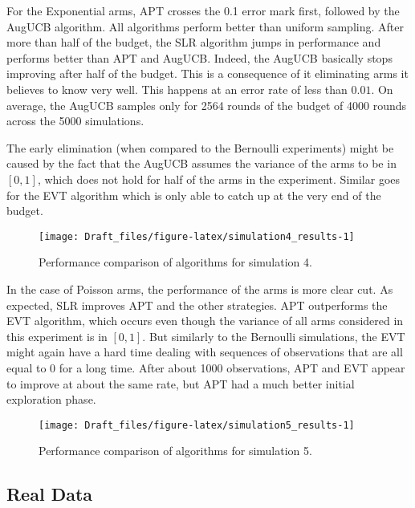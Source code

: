 \documentclass[11pt,]{article}
\begin{document}
For the Exponential arms, APT crosses the 0.1 error mark first, followed
by the AugUCB algorithm. All algorithms perform better than uniform
sampling. After more than half of the budget, the SLR algorithm jumps in
performance and performs better than APT and AugUCB. Indeed, the AugUCB
basically stops improving after half of the budget. This is a
consequence of it eliminating arms it believes to know very well. This
happens at an error rate of less than \(0.01\). On average, the AugUCB
samples only for 2564 rounds of the budget of 4000 rounds across the
5000 simulations.

The early elimination (when compared to the Bernoulli experiments) might
be caused by the fact that the AugUCB assumes the variance of the arms
to be in \([0,1]\), which does not hold for half of the arms in the
experiment. Similar goes for the EVT algorithm which is only able to
catch up at the very end of the budget.

\begin{figure}

{\centering \texttt{[image: Draft\_files/figure-latex/simulation4\_results-1]} 

}

\caption{Performance comparison of algorithms for simulation 4.}\label{fig:simulation4_results}
\end{figure}

In the case of Poisson arms, the performance of the arms is more clear
cut. As expected, SLR improves APT and the other strategies. APT
outperforms the EVT algorithm, which occurs even though the variance of
all arms considered in this experiment is in \([0,1]\). But similarly to
the Bernoulli simulations, the EVT might again have a hard time dealing
with sequences of observations that are all equal to \(0\) for a long
time. After about 1000 observations, APT and EVT appear to improve at
about the same rate, but APT had a much better initial exploration
phase.

\begin{figure}

{\centering \texttt{[image: Draft\_files/figure-latex/simulation5\_results-1]} 

}

\caption{Performance comparison of algorithms for simulation 5.}\label{fig:simulation5_results}
\end{figure}

\subsection{\texorpdfstring{Real Data
\label{sec:RealData}}{Real Data }}\label{real-data}
\end{document}
